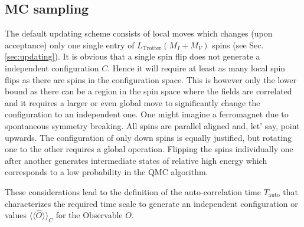 
\subsection{MC sampling}\label{sec:caveats}
%
The default updating scheme consists of local moves which changes (upon acceptance) only one single entry of $L_{\mathrm{Trotter}}(M_I+M_V)$ spins (see Sec. \ref{sec:updating}). It is obvious that a single spin flip does not generate a independent configuration $C$. Hence it will require at least as many local spin flips as there are spins in the configuration space. This is however only the lower bound as there can be a region in the spin space where the fields are correlated and it requires a larger or even global move to significantly change the configuration to an independent one. One might imagine a ferromagnet due to spontaneous symmetry breaking. All spins are parallel aligned and, let' say, point upwards. The configuration of only down spins is equally justified, but rotating one to the other requires a global operation. Flipping the spins individually one after another generates intermediate states of relative high energy which corresponds to a low probability in the QMC algorithm.

These considerations lead to the definition of the auto-correlation time $T_\mathrm{auto}$ that characterizes the required time scale to generate an independent configuration or values $\langle\langle\hat{O}\rangle\rangle_C$ for the Observable $O$.

